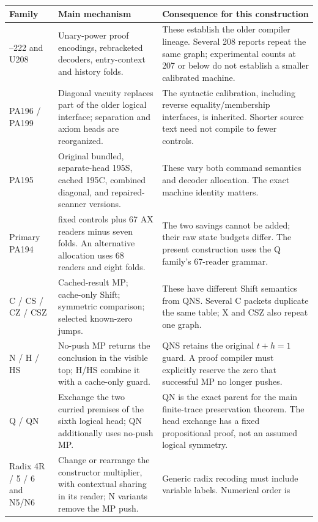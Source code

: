 \documentclass[11pt,letterpaper]{article}
\begin{document}
\small
\begin{longtable}{>{\raggedright\arraybackslash}p{.18\linewidth}
                  >{\raggedright\arraybackslash}p{.34\linewidth}
                  >{\raggedright\arraybackslash}p{.40\linewidth}}
\toprule Family & Main mechanism & Consequence for this construction\\\midrule\endhead
209--222 and U208 & Unary-power proof encodings, rebracketed decoders,
entry-context and history folds. & These establish the older compiler
lineage. Several 208 reports repeat the same graph; experimental counts
at 207 or below do not establish a smaller calibrated machine.\\
PA196 / PA199 & Diagonal vacuity replaces part of the older logical
interface; separation and axiom heads are reorganized. & The syntactic
calibration, including reverse equality/membership interfaces, is inherited.
Shorter source text need not compile to fewer controls.\\
PA195 & Original bundled, separate-head 195S, cached 195C, combined
diagonal, and repaired-scanner versions. & These vary both command
semantics and decoder allocation. The exact machine identity matters.\\
Primary PA194 & 134 fixed controls plus 67 AX readers minus seven folds.
An alternative allocation uses 68 readers and eight folds. & The two
savings cannot be added; their raw state budgets differ. The present
construction uses the Q family's 67-reader grammar.\\
C / CS / CZ / CSZ & Cached-result MP; cache-only Shift; symmetric
comparison; selected known-zero jumps. & These have different Shift
semantics from QNS. Several C packets duplicate the same table; X and
CSZ also repeat one graph.\\
N / H / HS & No-push MP returns the conclusion in the visible top;
H/HS combine it with a cache-only guard. & QNS retains the original
$t+h=1$ guard. A proof compiler must explicitly reserve the zero that
successful MP no longer pushes.\\
Q / QN & Exchange the two curried premises of the sixth logical head;
QN additionally uses no-push MP. & QN is the exact parent for the main
finite-trace preservation theorem. The head exchange has a fixed
propositional proof, not an assumed logical symmetry.\\
Radix 4R / 5 / 6 and N5/N6 & Change or rearrange the constructor multiplier,
with contextual sharing in its reader; N variants remove the MP push. &
Generic radix recoding must include variable labels. Numerical order is

\end{longtable}
\end{document}

